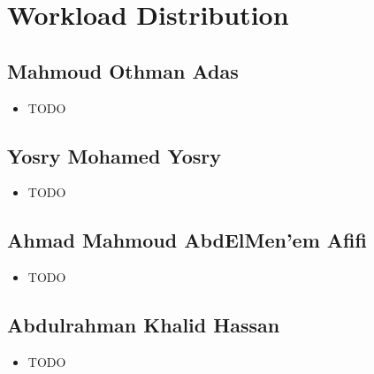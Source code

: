 \section{Workload Distribution}

\subsection{Mahmoud Othman Adas}
\begin{itemize}
    \item TODO
\end{itemize}

\subsection{Yosry Mohamed Yosry}
\begin{itemize}
    \item TODO
\end{itemize}

\subsection{Ahmad Mahmoud AbdElMen'em Afifi}
\begin{itemize}
    \item TODO
\end{itemize}

\subsection{Abdulrahman Khalid Hassan}
\begin{itemize}
    \item TODO
\end{itemize}
